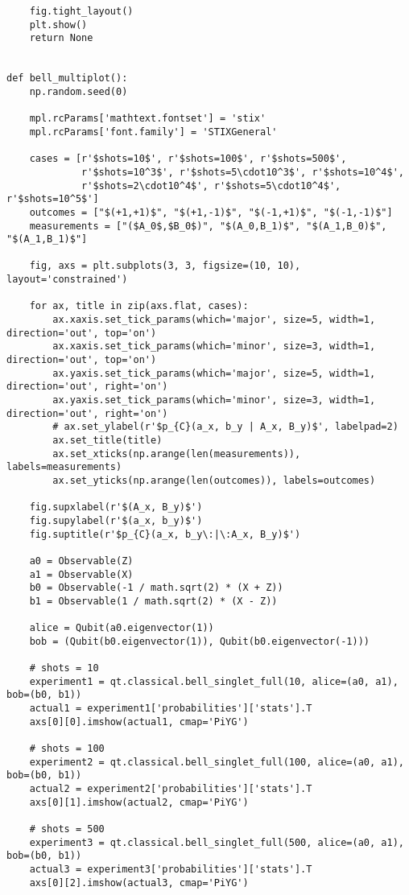\begin{verbatim}
    fig.tight_layout()
    plt.show()
    return None


def bell_multiplot():
    np.random.seed(0)

    mpl.rcParams['mathtext.fontset'] = 'stix'
    mpl.rcParams['font.family'] = 'STIXGeneral'

    cases = [r'$shots=10$', r'$shots=100$', r'$shots=500$',
             r'$shots=10^3$', r'$shots=5\cdot10^3$', r'$shots=10^4$',
             r'$shots=2\cdot10^4$', r'$shots=5\cdot10^4$', r'$shots=10^5$']
    outcomes = ["$(+1,+1)$", "$(+1,-1)$", "$(-1,+1)$", "$(-1,-1)$"]
    measurements = ["($A_0$,$B_0$)", "$(A_0,B_1)$", "$(A_1,B_0)$", "$(A_1,B_1)$"]

    fig, axs = plt.subplots(3, 3, figsize=(10, 10), layout='constrained')

    for ax, title in zip(axs.flat, cases):
        ax.xaxis.set_tick_params(which='major', size=5, width=1, direction='out', top='on')
        ax.xaxis.set_tick_params(which='minor', size=3, width=1, direction='out', top='on')
        ax.yaxis.set_tick_params(which='major', size=5, width=1, direction='out', right='on')
        ax.yaxis.set_tick_params(which='minor', size=3, width=1, direction='out', right='on')
        # ax.set_ylabel(r'$p_{C}(a_x, b_y | A_x, B_y)$', labelpad=2)
        ax.set_title(title)
        ax.set_xticks(np.arange(len(measurements)), labels=measurements)
        ax.set_yticks(np.arange(len(outcomes)), labels=outcomes)

    fig.supxlabel(r'$(A_x, B_y)$')
    fig.supylabel(r'$(a_x, b_y)$')
    fig.suptitle(r'$p_{C}(a_x, b_y\:|\:A_x, B_y)$')

    a0 = Observable(Z)
    a1 = Observable(X)
    b0 = Observable(-1 / math.sqrt(2) * (X + Z))
    b1 = Observable(1 / math.sqrt(2) * (X - Z))

    alice = Qubit(a0.eigenvector(1))
    bob = (Qubit(b0.eigenvector(1)), Qubit(b0.eigenvector(-1)))

    # shots = 10
    experiment1 = qt.classical.bell_singlet_full(10, alice=(a0, a1), bob=(b0, b1))
    actual1 = experiment1['probabilities']['stats'].T
    axs[0][0].imshow(actual1, cmap='PiYG')

    # shots = 100
    experiment2 = qt.classical.bell_singlet_full(100, alice=(a0, a1), bob=(b0, b1))
    actual2 = experiment2['probabilities']['stats'].T
    axs[0][1].imshow(actual2, cmap='PiYG')

    # shots = 500
    experiment3 = qt.classical.bell_singlet_full(500, alice=(a0, a1), bob=(b0, b1))
    actual3 = experiment3['probabilities']['stats'].T
    axs[0][2].imshow(actual3, cmap='PiYG')


\end{verbatim}
